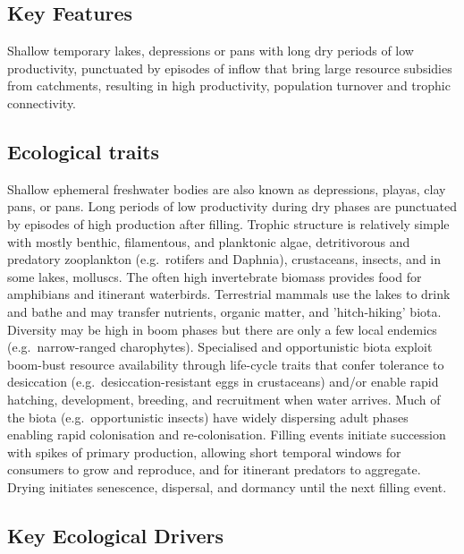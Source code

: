 \documentclass[
  letterpaper,
  DIV=11,
  numbers=noendperiod]{scrartcl}
\begin{document}
\subsection{Key Features}\label{key-features-12}

Shallow temporary lakes, depressions or pans with long dry periods of
low productivity, punctuated by episodes of inflow that bring large
resource subsidies from catchments, resulting in high productivity,
population turnover and trophic connectivity.

\subsection{Ecological traits}\label{ecological-traits-12}

Shallow ephemeral freshwater bodies are also known as depressions,
playas, clay pans, or pans. Long periods of low productivity during dry
phases are punctuated by episodes of high production after filling.
Trophic structure is relatively simple with mostly benthic, filamentous,
and planktonic algae, detritivorous and predatory zooplankton
(e.g.~rotifers and Daphnia), crustaceans, insects, and in some lakes,
molluscs. The often high invertebrate biomass provides food for
amphibians and itinerant waterbirds. Terrestrial mammals use the lakes
to drink and bathe and may transfer nutrients, organic matter, and
'hitch-hiking' biota. Diversity may be high in boom phases but there are
only a few local endemics (e.g.~narrow-ranged charophytes). Specialised
and opportunistic biota exploit boom-bust resource availability through
life-cycle traits that confer tolerance to desiccation
(e.g.~desiccation-resistant eggs in crustaceans) and/or enable rapid
hatching, development, breeding, and recruitment when water arrives.
Much of the biota (e.g.~opportunistic insects) have widely dispersing
adult phases enabling rapid colonisation and re-colonisation. Filling
events initiate succession with spikes of primary production, allowing
short temporal windows for consumers to grow and reproduce, and for
itinerant predators to aggregate. Drying initiates senescence,
dispersal, and dormancy until the next filling event.

\subsection{Key Ecological Drivers}\label{key-ecological-drivers-12}
\end{document}
